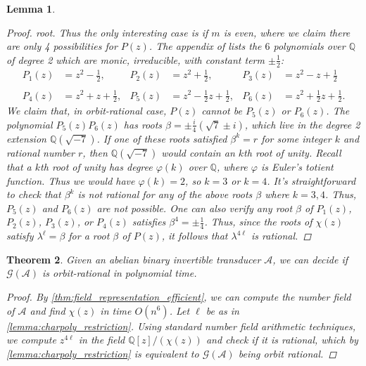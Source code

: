 \documentclass[12pt, letterpaper]{article}
\newcommand{\Q}{\mathbb Q}
\newcommand{\A}{\mathcal A}
\newcommand{\gp}{\mathcal G}
\newtheorem{thm}{Theorem}[section]
\newtheorem{lemma}[thm]{Lemma}
\begin{document}
\begin{lemma}
\begin{proof}
        root.  Thus the only interesting case is if $m$ is even, where we claim
        there are only 4 possibilities for $P(z)$. The appendix of
        \cite{Okano-Thesis} lists the $6$ polynomials over $\Q$ of degree 2
        which are monic, irreducible, with constant term $\pm \frac{1}{2}$:
        \begin{align*}
            P_1(z) &= z^2 - \frac{1}{2}, &
            P_2(z) &= z^2 + \frac{1}{2}, &
            P_3(z) &= z^2 - z + \frac{1}{2}\\\\
            P_4(z) &= z^2 + z + \frac{1}{2}, &
            P_5(z) &= z^2 - \frac{1}{2} z + \frac{1}{2}, &
            P_6(z) &= z^2 + \frac{1}{2} z + \frac{1}{2}.
        \end{align*}
        We claim that, in orbit-rational case, $P(z)$ cannot be $P_5(z)$ or
        $P_6(z)$.  The polynomial $P_5(z)P_6(z)$ has roots $\beta = \pm
        \frac{i}{4} (\sqrt{7} \pm i)$, which live in the degree 2 extension
        $\Q(\sqrt{-7})$. If one of these roots satisfied $\beta^k = r$ for some
        integer $k$ and rational number $r$, then $\Q(\sqrt{-7})$ would contain
        an $k$th root of unity. Recall that a $k$th root of unity has degree
        $\varphi(k)$ over $\Q$, where $\varphi$ is Euler's totient function.
        Thus we would have $\varphi(k) = 2$, so $k = 3$ or $k = 4$. It's
        straightforward to check that $\beta^k$ is not rational for any of the
        above roots $\beta$ where $k = 3,4$.  Thus, $P_5(z)$ and $P_6(z)$ are
        not possible. One can also verify any root $\beta$ of $P_1(z)$,
        $P_2(z)$, $P_3(z)$, or $P_4(z)$ satisfies $\beta^4 = \pm \frac{1}{4}$.
        Thus, since the roots of $\chi(z)$ satisfy $\lambda^\ell = \beta$ for a
        root $\beta$ of $P(z)$, it follows that $\lambda^{4\ell}$ is rational.
    \end{proof}
\end{lemma}

\begin{thm}\label{thm:orbit_algorithm}
    Given an abelian binary invertible transducer $\A$, we can decide if
    $\gp(\A)$ is orbit-rational in polynomial time.
    \begin{proof}
        By \cref{thm:field_representation_efficient}, we can compute the
        number field of $\A$ and find $\chi(z)$ in time $O(n^6)$.  Let $\ell$
        be as in \cref{lemma:charpoly_restriction}. Using standard number field
        arithmetic techniques, we compute $z^{4 \ell}$ in the field $\Q[z] /
        (\chi(z))$ and check if it is rational, which by
        \cref{lemma:charpoly_restriction} is equivalent to $\gp(\A)$ being
        orbit rational.
    \end{proof}
\end{thm}
\end{document}
